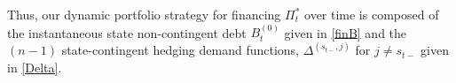 \documentclass[12pt]{article}
\newcommand{\NW}[1]{{\textcolor{blue}{#1}}}
\newcommand{\WJ}[1]{{\textcolor{red}{#1}}}
\begin{document}
Thus, our  dynamic portfolio strategy for financing $\Pi_t^\ast$ over time is composed of the instantaneous state non-contingent debt $B^{(0)}_t $ given in \eqref{finB} and  the $(n-1)$ state-contingent hedging demand functions, $	\Delta_{}^{(s_{t-}, j)}$ for $j\neq s_{t-}$ given in \eqref{Delta}. 
%
%
%
\end{document}
